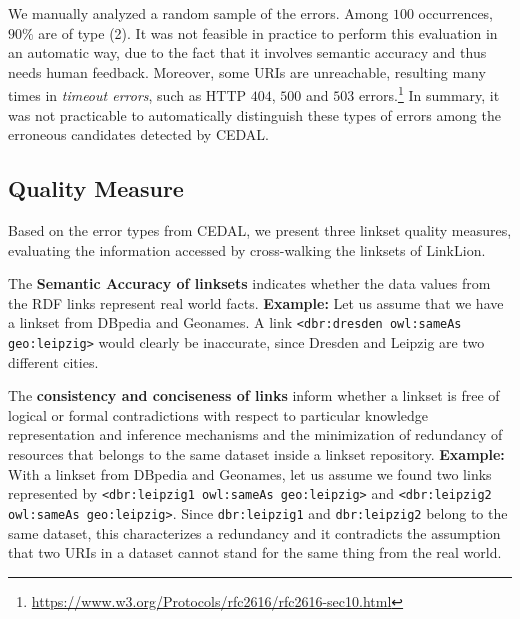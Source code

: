 We manually analyzed a random sample of the errors. Among $100$ occurrences, $90\%$ are of type (2). It was not feasible in practice to perform this evaluation in an automatic way, due to the fact that it involves semantic accuracy and thus needs human feedback. Moreover, some URIs are unreachable, resulting many times in \textit{timeout errors}, such as HTTP $404$, $500$ and $503$ errors.\footnote{\url{https://www.w3.org/Protocols/rfc2616/rfc2616-sec10.html}} In summary, it was not practicable to automatically distinguish these types of errors among the erroneous candidates detected by CEDAL. %

\subsection{Quality Measure}

Based on the error types from CEDAL, we present three linkset quality measures, evaluating the information accessed by cross-walking the linksets of LinkLion.

The \textbf{Semantic Accuracy of linksets} indicates whether the data values from the RDF links represent real world facts.
\textbf{Example:} Let us assume that we have a linkset from DBpedia and Geonames. A link \texttt{<dbr:dresden owl:sameAs geo:leipzig>} would clearly be inaccurate, since Dresden and Leipzig are two different cities.

The \textbf{consistency and conciseness of links} inform whether a linkset is free of logical or formal contradictions with respect to particular knowledge representation and inference mechanisms and the minimization of redundancy of resources that belongs to the same dataset inside a linkset repository.
\textbf{Example:} With a linkset from DBpedia and Geonames, let us assume we found two links represented by \texttt{<dbr:leipzig1 owl:sameAs geo:leipzig>} and \texttt{<dbr:leipzig2 owl:sameAs geo:leipzig>}. Since \texttt{dbr:leipzig1} and \texttt{dbr:leipzig2} belong to the same dataset, this characterizes a redundancy and it contradicts the assumption that two URIs in a dataset cannot stand for the same thing from the real world.


